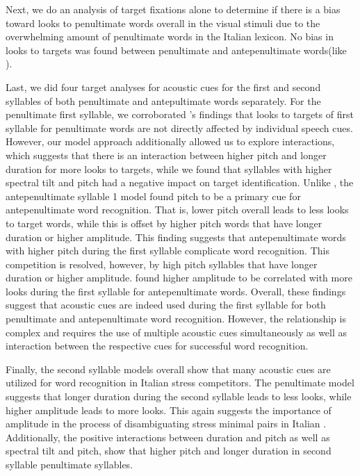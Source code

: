 Next, we do an analysis of target fixations alone to determine if there is a bias toward looks to penultimate words overall in the visual stimuli due to the overwhelming amount of penultimate words in the Italian lexicon. No bias in looks to targets was found between penultimate and antepenultimate words(like \cite{Sulpizio_McQueen_2012}).

Last, we did four target analyses for acoustic cues for the first and second syllables of both penultimate and antepultimate words separately. 
For the penultimate first syllable, we corroborated \cite{Sulpizio_McQueen_2012}'s findings that looks to targets of first syllable for penultimate words are not directly affected by individual speech cues. However, our model approach additionally allowed us to explore interactions, which suggests that there is an interaction between higher pitch and longer duration for more looks to targets, while we found that syllables with higher spectral tilt and pitch had a negative impact on target identification. Unlike \cite{Sulpizio_McQueen_2012}, the antepenultimate syllable 1 model found pitch to be a primary cue for antepenultimate word recognition. That is, lower pitch overall leads to less looks to target words, while this is offset by higher pitch words that have longer duration or higher amplitude. This finding suggests that antepenultimate words with higher pitch during the first syllable complicate word recognition. This competition is resolved, however, by high pitch syllables that have longer duration or higher amplitude. \cite{Sulpizio_McQueen_2012} found higher amplitude to be correlated with more looks during the first syllable for antepenultimate words. Overall, these findings suggest that acoustic cues are indeed used during the first syllable for both penultimate and antepenultimate word recognition. However, the relationship is complex and requires the use of multiple acoustic cues simultaneously as well as interaction between the respective cues for successful word recognition.

Finally, the second syllable models overall show that many acoustic cues are utilized for word recognition in Italian stress competitors. The penultimate model suggests that longer duration during the second syllable leads to less looks, while higher amplitude leads to more looks. This again suggests the importance of amplitude in the process of disambiguating stress minimal pairs in Italian \citep{Sulpizio_McQueen_2012}. Additionally, the positive interactions between duration and pitch as well as spectral tilt and pitch, show that higher pitch and longer duration in second syllable penultimate syllables.  

